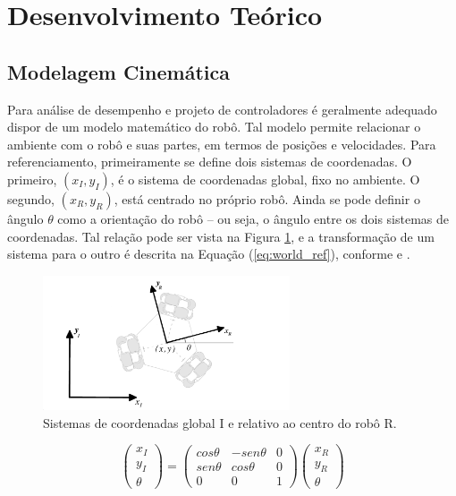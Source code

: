 \section{Desenvolvimento Teórico}
\label{sec:teorico}

\subsection{Modelagem Cinemática}

Para análise de desempenho e projeto de controladores é geralmente adequado dispor de um modelo matemático do robô. Tal modelo permite relacionar o ambiente com o robô e suas partes, em termos de posições e velocidades. Para referenciamento, primeiramente se define dois sistemas de coordenadas. O primeiro, $(x_I,y_I)$, é o sistema de coordenadas global, fixo no ambiente. O segundo, $(x_R,y_R)$, está centrado no próprio robô. Ainda se pode definir o ângulo $\theta$ como a orientação do robô -- ou seja, o ângulo entre os dois sistemas de coordenadas. Tal relação pode ser vista na Figura \ref{fig:ref}, e a transformação de um sistema para o outro é descrita na Equação (\ref{eq:world_ref}), conforme \citet{siegwart2011introduction} e \citet{ritter2016modelagem}.

\begin{figure}[h]
  \centering
  \includegraphics[width = 0.65\textwidth]{imagens/ref}
  \caption{Sistemas de coordenadas global I e relativo ao centro do robô R.}
  \label{fig:ref}
\end{figure}

\begin{equation}
  \begin{pmatrix}
    x_I \\
    y_I \\
    \theta
  \end{pmatrix}
  =
  \begin{pmatrix}
    cos \theta & -sen \theta & 0 \\
    sen\theta  &  cos \theta & 0 \\
    0          & 0          & 1
  \end{pmatrix}
  \begin{pmatrix}
    x_R \\
    y_R \\
    \theta
  \end{pmatrix}
  \label{eq:world_ref}
\end{equation}

